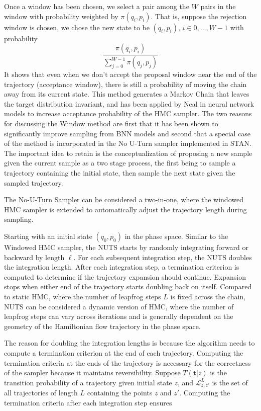 \documentclass[]{report}
\begin{document}
Once a window has been chosen, we select a pair among the $W$ pairs in the window with probability weighted by $\pi(q_i,p_i)$. That is, suppose the rejection window is chosen, we chose the new state to be $(q_i,p_i)$, $i \in {0,\dots,W-1}$ with probability 
\[ \frac{\pi(q_i,p_i)}{\sum_{j=0}^{W-1} \pi(q_j,p_j)} \]
It shows that even when we don't accept the proposal window near the end of the trajectory (acceptance window), there is still a probability of moving the chain away from its current state. This method generates a Markov Chain that leaves the target distribution invariant, and has been applied by Neal in neural network models to increase acceptance probability of the HMC sampler\cite{neal1992improved}. The two reasons for discussing the Window method are first that it has been shown to
significantly improve sampling from BNN models and second that a special case of
the method is incorporated in the No U-Turn sampler implemented in STAN. The important idea to retain is the conceptualization of proposing a new sample given the current sample as a two stage process, the first being to sample a trajectory containing the initial state, then sample the next state given the sampled trajectory.


The No-U-Turn Sampler \cite{hoffman2014no} can be considered a two-in-one, where the windowed HMC sampler is extended to automatically adjust the trajectory length during sampling. 

Starting with an initial state $(q_0,p_0)$ in the phase space. Similar to the Windowed HMC sampler, the NUTS starts by randomly integrating forward or backward by length $\ell$. For each subsequent integration step, the NUTS doubles the integration length. After each integration step, a termination criterion is computed to determine if the trajectory expansion should continue. Expansion stops when either end of the trajectory starts doubling back on itself. Compared to static HMC, where the number of leapfrog steps $L$ is fixed across the chain, NUTS can be considered a dynamic version of HMC, where the number of leapfrog steps can vary across iterations and is generally dependent on the geometry of the Hamiltonian flow trajectory in the phase space. 

The reason for doubling the integration lengths is because the algorithm needs to compute a termination criterion at the end of each trajectory. Computing the termination criteria at the ends of the trajectory is necessary for the correctness of the sampler because it maintains reversibility. Suppose $T(\mathbf{t}|z) $ is the transition probability of a trajectory given initial state $z$, and $\mathcal{L}^L_{z,z'}$ is the set of all trajectories of length $L$ containing the points $z$ and $z'$. Computing the termination criteria after each integration step ensures
\end{document}

